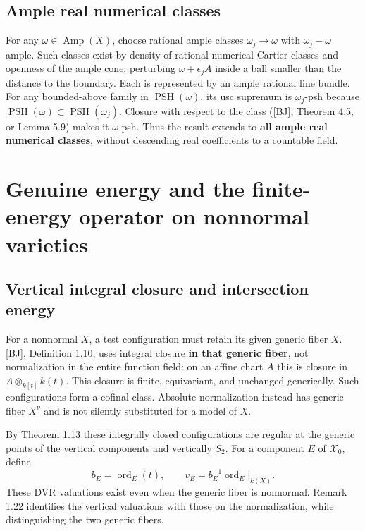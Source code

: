 \documentclass[11pt]{article}
\begin{document}
\subsection{Ample real numerical
classes}\label{ample-real-numerical-classes}

For any \(\omega\in\operatorname{Amp}(X)\), choose rational ample
classes \(\omega_j\to\omega\) with \(\omega_j-\omega\) ample. Such
classes exist by density of rational numerical Cartier classes and
openness of the ample cone, perturbing \(\omega+\epsilon_j A\) inside a
ball smaller than the distance to the boundary. Each is represented by
an ample rational line bundle. For any bounded-above family in
\(\operatorname{PSH}(\omega)\), its usc supremum is \(\omega_j\)-psh
because
\(\operatorname{PSH}(\omega)\subset\operatorname{PSH}(\omega_j)\).
Closure with respect to the class ({[}BJ{]}, Theorem 4.5, or Lemma 5.9)
makes it \(\omega\)-psh. Thus the result extends to \textbf{all ample
real numerical classes}, without descending real coefficients to a
countable field.

\section{Genuine energy and the finite-energy operator on nonnormal
varieties}\label{genuine-energy-and-the-finite-energy-operator-on-nonnormal-varieties}

\subsection{Vertical integral closure and intersection
energy}\label{vertical-integral-closure-and-intersection-energy}

For a nonnormal \(X\), a test configuration must retain its given
generic fiber \(X\). {[}BJ{]}, Definition 1.10, uses integral closure
\textbf{in that generic fiber}, not normalization in the entire function
field: on an affine chart \(A\) this is closure in
\(A\otimes_{k[t]}k(t)\). This closure is finite, equivariant, and
unchanged generically. Such configurations form a cofinal class.
Absolute normalization instead has generic fiber \(X^\nu\) and is not
silently substituted for a model of \(X\).

By Theorem 1.13 these integrally closed configurations are regular at
the generic points of the vertical components and vertically \(S_2\).
For a component \(E\) of \(\mathcal X_0\), define
\[b_E=\operatorname{ord}_E(t),\qquad
v_E=b_E^{-1}\operatorname{ord}_E|_{k(X)}.\] These DVR valuations exist
even when the generic fiber is nonnormal. Remark 1.22 identifies the
vertical valuations with those on the normalization, while
distinguishing the two generic fibers.
\end{document}
